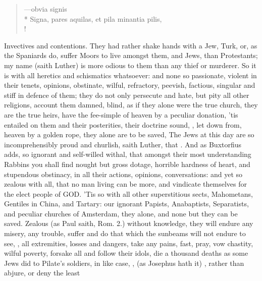 {\begin{latin}
\begin{verse}%
---obvia signis\\*
Signa, pares aquilas, et pila minantia pilis,\\!
\end{verse}%
\end{latin}

Invectives and contentions. They had rather shake hands with a Jew,
Turk, or, as the Spaniards do, suffer Moors to live amongst them, and
Jews, than Protestants; my name (saith Luther) is more odious to
them than any thief or murderer. So it is with all heretics and
schismatics whatsoever: and none so passionate, violent in their
tenets, opinions, obstinate, wilful, refractory, peevish, factious,
singular and stiff in defence of them; they do not only persecute and
hate, but pity all other religions, account them damned, blind, as if
they alone were the true church, they are the true heirs, have the
fee-simple of heaven by a peculiar donation, 'tis entailed on them and
their posterities, their doctrine sound, , let down from, heaven by a golden rope, they alone
are to be saved, The Jews at this day are so incomprehensibly proud and
churlish, saith Luther, that . And as Buxtorfius adds, so ignorant and
self-willed withal, that amongst their most understanding Rabbins you
shall find nought but gross dotage, horrible hardness of heart, and
stupendous obstinacy, in all their actions, opinions, conversations:
and yet so zealous with all, that no man living can be more, and
vindicate themselves for the elect people of \textsc{GOD}. 'Tis so with all
other superstitious sects, Mahometans, Gentiles in China, and Tartary:
our ignorant Papists, Anabaptists, Separatists, and peculiar churches
of Amsterdam, they alone, and none but they can be saved. Zealous
(as Paul saith, Rom.  2.) without knowledge, they will endure any
misery, any trouble, suffer and do that which the sunbeams will not
endure to see, , all extremities, losses and
dangers, take any pains, fast, pray, vow chastity, wilful poverty,
forsake all and follow their idols, die a thousand deaths as some Jews
did to Pilate's soldiers, in like case, , (as Josephus hath it) , rather than abjure, or deny the least
}
